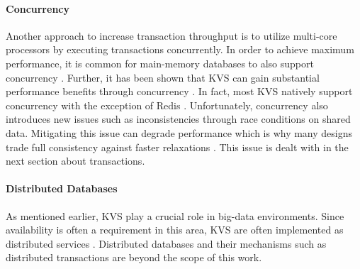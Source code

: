 \paragraph{Concurrency}

Another approach to increase transaction throughput is to utilize multi-core
processors by executing transactions concurrently. In order to achieve maximum
performance, it is common for main-memory databases to also support concurrency
\cite{grund2010hyrise, faerber2012hana, diaconu2013hekaton}. Further, it has
been shown that \ac{KVS} can gain substantial performance benefits through
concurrency \cite{fan2013memc3, li2015architecting, xu2014building}. In fact,
most \ac{KVS} natively support concurrency with the exception of Redis
\cite{redis2017home}. Unfortunately, concurrency also introduces new issues such
as inconsistencies through race conditions on shared data. Mitigating this issue
can degrade performance which is why many designs trade full consistency against
faster relaxations \cite{decandia2007dynamo}. This issue is dealt with in the
next section about transactions.

\paragraph{Distributed Databases}

As mentioned earlier, \ac{KVS} play a crucial role in big-data environments. Since
availability is often a requirement in this area, \ac{KVS} are often implemented as
distributed services \cite{decandia2007dynamo, lakshman2010cassandra,
wang2015hydradb}. Distributed databases and their mechanisms such as distributed
transactions are beyond the scope of this work.
